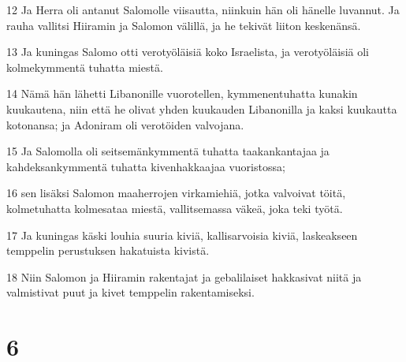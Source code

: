 \par 12 Ja Herra oli antanut Salomolle viisautta, niinkuin hän oli hänelle luvannut. Ja rauha vallitsi Hiiramin ja Salomon välillä, ja he tekivät liiton keskenänsä.
\par 13 Ja kuningas Salomo otti verotyöläisiä koko Israelista, ja verotyöläisiä oli kolmekymmentä tuhatta miestä.
\par 14 Nämä hän lähetti Libanonille vuorotellen, kymmenentuhatta kunakin kuukautena, niin että he olivat yhden kuukauden Libanonilla ja kaksi kuukautta kotonansa; ja Adoniram oli verotöiden valvojana.
\par 15 Ja Salomolla oli seitsemänkymmentä tuhatta taakankantajaa ja kahdeksankymmentä tuhatta kivenhakkaajaa vuoristossa;
\par 16 sen lisäksi Salomon maaherrojen virkamiehiä, jotka valvoivat töitä, kolmetuhatta kolmesataa miestä, vallitsemassa väkeä, joka teki työtä.
\par 17 Ja kuningas käski louhia suuria kiviä, kallisarvoisia kiviä, laskeakseen temppelin perustuksen hakatuista kivistä.
\par 18 Niin Salomon ja Hiiramin rakentajat ja gebalilaiset hakkasivat niitä ja valmistivat puut ja kivet temppelin rakentamiseksi.

\chapter{6}

